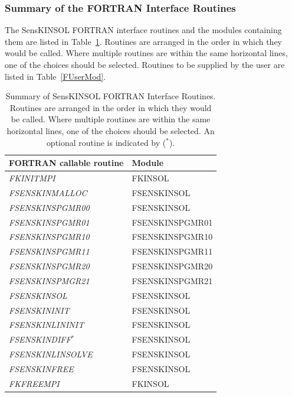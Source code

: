 \documentclass[11pt]{article}
\begin{document}
\subsubsection{Summary of the FORTRAN Interface Routines}

The SensKINSOL FORTRAN interface routines and the modules containing
them are listed in \mbox{Table \ref{FSensMod}}. Routines are arranged in
the order in which they would be called. Where multiple routines are
within the same horizontal lines, one of the choices should be
selected. Routines to be supplied by the user are listed in \mbox{Table
\ref{FUserMod}}.

\begin{table}
\caption{Summary of SensKINSOL FORTRAN Interface Routines. Routines are
arranged in the order in which they would be called. Where multiple
routines are within the same horizontal lines, one of the choices
should be selected. An optional routine is indicated by ($^*$).}
\label{FSensMod}
\begin{center}
\begin{tabular}{|l|l|}
\hline
FORTRAN callable routine &  Module \\
\hline \hline
{\em FKINITMPI} & FKINSOL \\
\hline
{\em FSENSKINMALLOC} & FSENSKINSOL \\
\hline
{\em FSENSKINSPGMR00} & FSENSKINSOL \\
{\em FSENSKINSPGMR01} & FSENSKINSPGMR01 \\
{\em FSENSKINSPGMR10} & FSENSKINSPGMR10 \\
{\em FSENSKINSPGMR11} & FSENSKINSPGMR11 \\
{\em FSENSKINSPGMR20} & FSENSKINSPGMR20 \\
{\em FSENSKINSPMGR21} & FSENSKINSPGMR21 \\
\hline
{\em FSENSKINSOL} & FSENSKINSOL \\
{\em FSENSKININIT} & FSENSKINSOL \\
\hline
{\em FSENSKINLININIT} & FSENSKINSOL \\
\hline
{\em FSENSKINDIFF$^*$} & FSENSKINSOL \\
\hline
{\em FSENSKINLINSOLVE} & FSENSKINSOL \\
\hline
{\em FSENSKINFREE} & FSENSKINSOL \\
\hline
{\em FKFREEMPI} & FKINSOL \\
\hline
\end{tabular}
\end{center}
\end{table}
\end{document}
